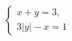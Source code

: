 \begin{ex}
	\begin{condition}
		\( \left\{
		\begin{array}{l}
			x+y=3,\\
			3|y|-x=1
		\end{array}
		\right. \)
	\end{condition}
\end{ex}